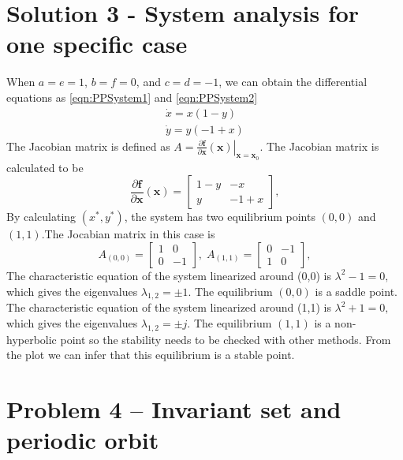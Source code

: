 \documentclass[a4paper,twocolumn]{article} %
\begin{document}
\section*{Solution 3 - System analysis for one specific case}
\label{sec:solu3}
When 
$a=e=1$, $b=f=0$, and $c=d=-1$,
  we can obtain the differential equations as \eqref{eqn:PPSystem1} and \eqref{eqn:PPSystem2} 
\begin{subequations}\label{eqn:PPSystem}
\begin{align}
    \dot{x} = x(1-y) \label{eqn:PPSystem1} \\
    \dot{y} = y(-1+x) \label{eqn:PPSystem2}
\end{align}
\end{subequations}
The Jacobian matrix is defined as $A = \left. \frac{\partial\textbf{f}}{\partial \textbf{x}}(\textbf{x}) \right|_{\textbf{x}=\textbf{x}_0}$. The Jacobian matrix is calculated to be
\begin{equation*}
    \frac{\partial\textbf{f}}{\partial \textbf{x}}(\textbf{x}) =
    \left[\begin{array}{cc}
    1-y & -x \\
    y & -1+x
    \end{array}\right],
\end{equation*}
By calculating $(x^*,y^*)$, the system has two equilibrium points $(0,0)$ and $(1,1)$.The Jocabian matrix in this case is
\begin{equation*}
    A_{(0,0)} =
    \left[\begin{array}{cc}
    1 & 0 \\
    0 & -1
    \end{array}\right], \; A_{(1,1)} =
    \left[\begin{array}{cc}
    0 & -1 \\
    1 & 0
    \end{array}\right],   
    \end{equation*}
 The characteristic equation of the system linearized around \mbox{(0,0)} is
$\lambda^2 -1 = 0,$ which gives the eigenvalues $\lambda_{1,2} = \pm 1$. The equilibrium $(0,0)$ is a saddle point. 
The characteristic equation of the system linearized around \mbox{(1,1)} is
$\lambda^2 +1 = 0,$ which gives the eigenvalues $\lambda_{1,2} = \pm j$. The equilibrium $(1,1)$ is a non-hyperbolic point so the stability needs to be checked with other methods. From the plot we can infer that this equilibrium is a stable point.  

\section*{Problem 4 -- Invariant set and periodic orbit}
\label{sec:pro4}
\end{document}
